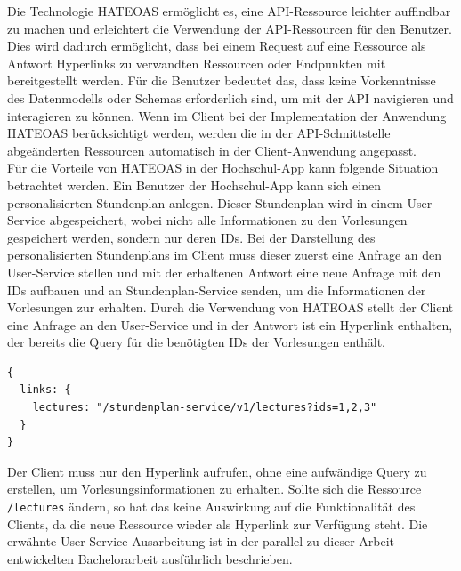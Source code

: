 Die Technologie \ac{HATEOAS} ermöglicht es, eine \ac{API}-Ressource leichter auffindbar zu machen und erleichtert die Verwendung der \ac{API}-Ressourcen für den Benutzer. Dies wird dadurch ermöglicht, dass bei einem Request auf eine Ressource als Antwort Hyperlinks zu verwandten Ressourcen oder Endpunkten mit bereitgestellt werden. Für die Benutzer bedeutet das, dass keine Vorkenntnisse des Datenmodells oder Schemas erforderlich sind, um mit der \ac{API} navigieren und interagieren zu können. Wenn im Client bei der Implementation der Anwendung \ac{HATEOAS} berücksichtigt werden, werden die in der \ac{API}-Schnittstelle abgeänderten Ressourcen automatisch in der Client-Anwendung angepasst.
\\
\linebreak
Für die Vorteile von \ac{HATEOAS} in der Hochschul-\ac{App} kann folgende Situation betrachtet werden. Ein Benutzer der Hoch\-schul-\ac{App} kann sich einen personalisierten Stundenplan anlegen. Dieser Stundenplan wird in einem User-Service abgespeichert, wobei nicht alle Informationen zu den Vorlesungen gespeichert werden, sondern nur deren \acp{ID}. Bei der Darstellung des personalisierten Stundenplans im Client muss dieser zuerst eine Anfrage an den User-Service stellen und mit der erhaltenen Antwort eine neue Anfrage mit den \acp{ID} aufbauen und an Stundenplan-Service senden, um die Informationen der Vorlesungen zur erhalten. Durch die Verwendung von \ac{HATEOAS} stellt der Client eine Anfrage an den User-Service und in der Antwort ist ein Hyperlink enthalten, der bereits die Query für die benötigten \acp{ID} der Vorlesungen enthält.

\begin{lstlisting}[caption={HATEOAS Hyperlink}]
{
  links: {
    lectures: "/stundenplan-service/v1/lectures?ids=1,2,3"
  }
}
\end{lstlisting}

Der Client muss nur den Hyperlink aufrufen, ohne eine aufwändige Query zu erstellen, um Vorlesungsinformationen zu erhalten. Sollte sich die Ressource \lstinline[columns=fixed]{/lectures} %
ändern, so hat das keine Auswirkung auf die Funktionalität des Clients, da die neue Ressource wieder als Hyperlink zur Verfügung steht. Die erwähnte User-Service Ausarbeitung ist in der parallel zu dieser Arbeit entwickelten Bachelorarbeit ausführlich beschrieben\autocite[Vgl.][]{andreasba}.

